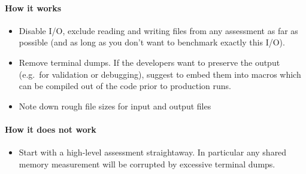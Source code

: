 \paragraph*{How it works}

\begin{itemize}[noitemsep]
  \item[$\boxplus$] Disable I/O, exclude reading and writing files from any assessment as far as possible (and as long as you don't want to benchmark exactly this I/O).
  \item[$\boxplus$] Remove terminal dumps. If the developers want to preserve the output (e.g.~for validation or debugging), suggest to embed them into macros which can be compiled out of the code prior to production runs.
  \item[$\boxplus$] Note down rough file sizes for input and output files
\end{itemize}


\paragraph*{How it does not work}

\begin{itemize}[noitemsep]
  \item[$\boxminus$] Start with a high-level assessment straightaway. In particular any shared memory measurement will be corrupted by excessive terminal dumps.
\end{itemize}

